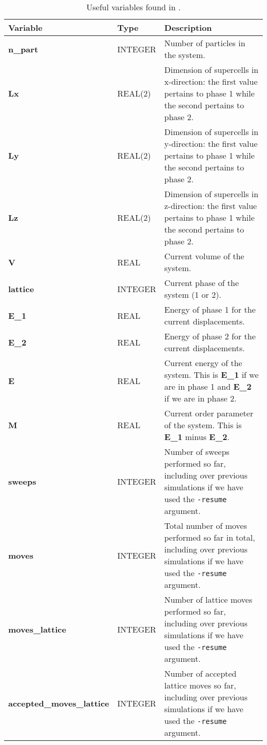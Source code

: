 \documentclass{report}
\begin{document}
\begin{landscape}
\begin{center}\label{table:state_variables}
\begin{longtable}{ l l p{8cm}}
\caption{Useful variables found in .}
\\

Variable & Type & Description \\
\hline
\textbf{n\_part} & INTEGER & Number of particles in the system. \\
\textbf{Lx} & REAL(2) & Dimension of supercells in x-direction: the first value pertains to phase 1 while the second pertains to phase 2.\\
\textbf{Ly} & REAL(2) & Dimension of supercells in y-direction: the first value pertains to phase 1 while the second pertains to phase 2.\\
\textbf{Lz} & REAL(2) & Dimension of supercells in z-direction: the first value pertains to phase 1 while the second pertains to phase 2.\\
\textbf{V} & REAL & Current volume of the system.\\
\textbf{lattice} & INTEGER & Current phase of the system (1 or 2).\\
\textbf{E\_1} & REAL & Energy of phase 1 for the current displacements. \\
\textbf{E\_2} & REAL & Energy of phase 2 for the current displacements. \\
\textbf{E} & REAL & Current energy of the system. This is \textbf{E\_1} if we are in phase 1 and \textbf{E\_2} if we are in phase 2.\\
\textbf{M} & REAL & Current order parameter of the system. This is \textbf{E\_1} minus \textbf{E\_2}.\\
\textbf{sweeps} & INTEGER & Number of sweeps performed so far, including over previous simulations if we have used the \texttt{-resume} argument.\\
\textbf{moves} & INTEGER & Total number of moves performed so far in total, including over previous simulations if we have used the \texttt{-resume} 
argument.\\
\textbf{moves\_lattice} & INTEGER & Number of lattice moves performed so far, including over previous simulations if we have used the 
 \texttt{-resume} argument.\\
\textbf{accepted\_moves\_lattice} & INTEGER & Number of accepted lattice moves so far, including over previous simulations if we have used the 
 \texttt{-resume} argument.\\

\end{longtable}
\end{center}
\end{landscape}
\end{document}
